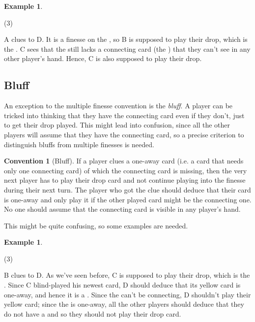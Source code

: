 \documentclass[a4paper]{article}
\theoremstyle{plain}
\theoremstyle{definition}
\newtheorem{example}[theorem]{Example}
\newtheorem{convention}[theorem]{Convention}
\begin{document}
\begin{example}
	\hfill
	\begin{tasks}(3)
		\task[+]      
		\task[A]    
		\task[B]    
		\task[C]    
		\task[D]    
		\task[E]    
	\end{tasks}
	
	A clues  to D. It is a finesse on the , so B is supposed to play their drop, which is the . C sees that the  still lacks a connecting card (the ) that they can't see in any other player's hand. Hence, C is also supposed to play their drop.
\end{example}

\subsection{Bluff}

An exception to the multiple finesse convention is the \textit{bluff}. A player can be tricked into thinking that they have the connecting card even if they don't, just to get their drop played. This might lead into confusion, since all the other players will assume that they have the connecting card, so a precise criterion to distinguish bluffs from multiple finesses is needed.

\begin{convention}[Bluff]
	If a player clues a one-away card (i.e. a card that needs only one connecting card) of which the connecting card is missing, then the very next player has to play their drop card and not continue playing into the finesse during their next turn. The player who got the clue should deduce that their card is one-away and only play it if the other played card might be the connecting one. No one should assume that the connecting card is visible in any player's hand.
\end{convention}

This might be quite confusing, so some examples are needed.

\begin{example}
	\hfill
	\begin{tasks}(3)
		\task[+]      
		\task[A]    
		\task[B]    
		\task[C]    
		\task[D]    
		\task[E]    
	\end{tasks}
	
	B clues  to D. As we've seen before, C is supposed to play their drop, which is the . Since C blind-played his newest card, D should deduce that its yellow card is one-away, and hence it is a . Since the  can't be connecting, D shouldn't play their yellow card; since the  is one-away, all the other players should deduce that they do not have a  and so they should not play their drop card.
\end{example}
\end{document}
